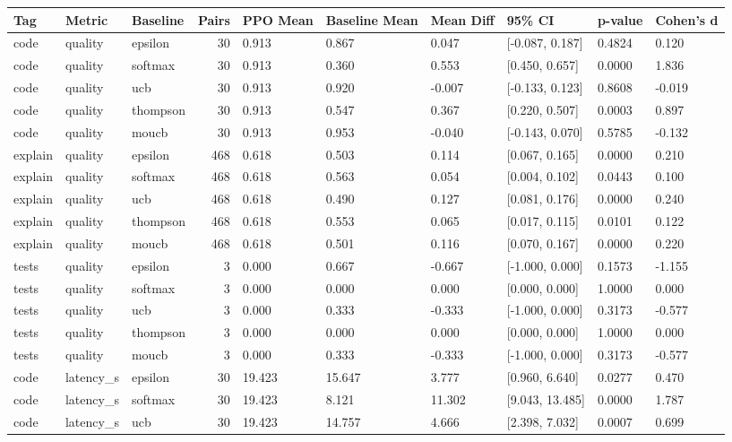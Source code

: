 \begin{tabular}{lllrllllll}
\toprule
Tag & Metric & Baseline & Pairs & PPO Mean & Baseline Mean & Mean Diff & 95\% CI & p-value & Cohen's d \\
\midrule
code & quality & epsilon & 30 & 0.913 & 0.867 & 0.047 & [-0.087, 0.187] & 0.4824 & 0.120 \\
code & quality & softmax & 30 & 0.913 & 0.360 & 0.553 & [0.450, 0.657] & 0.0000 & 1.836 \\
code & quality & ucb & 30 & 0.913 & 0.920 & -0.007 & [-0.133, 0.123] & 0.8608 & -0.019 \\
code & quality & thompson & 30 & 0.913 & 0.547 & 0.367 & [0.220, 0.507] & 0.0003 & 0.897 \\
code & quality & moucb & 30 & 0.913 & 0.953 & -0.040 & [-0.143, 0.070] & 0.5785 & -0.132 \\
explain & quality & epsilon & 468 & 0.618 & 0.503 & 0.114 & [0.067, 0.165] & 0.0000 & 0.210 \\
explain & quality & softmax & 468 & 0.618 & 0.563 & 0.054 & [0.004, 0.102] & 0.0443 & 0.100 \\
explain & quality & ucb & 468 & 0.618 & 0.490 & 0.127 & [0.081, 0.176] & 0.0000 & 0.240 \\
explain & quality & thompson & 468 & 0.618 & 0.553 & 0.065 & [0.017, 0.115] & 0.0101 & 0.122 \\
explain & quality & moucb & 468 & 0.618 & 0.501 & 0.116 & [0.070, 0.167] & 0.0000 & 0.220 \\
tests & quality & epsilon & 3 & 0.000 & 0.667 & -0.667 & [-1.000, 0.000] & 0.1573 & -1.155 \\
tests & quality & softmax & 3 & 0.000 & 0.000 & 0.000 & [0.000, 0.000] & 1.0000 & 0.000 \\
tests & quality & ucb & 3 & 0.000 & 0.333 & -0.333 & [-1.000, 0.000] & 0.3173 & -0.577 \\
tests & quality & thompson & 3 & 0.000 & 0.000 & 0.000 & [0.000, 0.000] & 1.0000 & 0.000 \\
tests & quality & moucb & 3 & 0.000 & 0.333 & -0.333 & [-1.000, 0.000] & 0.3173 & -0.577 \\
code & latency_s & epsilon & 30 & 19.423 & 15.647 & 3.777 & [0.960, 6.640] & 0.0277 & 0.470 \\
code & latency_s & softmax & 30 & 19.423 & 8.121 & 11.302 & [9.043, 13.485] & 0.0000 & 1.787 \\
code & latency_s & ucb & 30 & 19.423 & 14.757 & 4.666 & [2.398, 7.032] & 0.0007 & 0.699 \\

\end{tabular}
